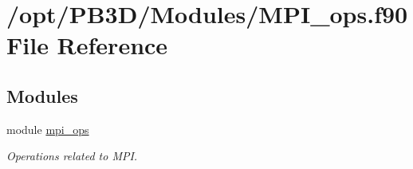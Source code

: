 \hypertarget{MPI__ops_8f90}{}\section{/opt/\+P\+B3\+D/\+Modules/\+M\+P\+I\+\_\+ops.f90 File Reference}
\label{MPI__ops_8f90}
\subsection*{Modules}
\begin{DoxyCompactItemize}
\item 
module \hyperlink{namespacempi__ops}{mpi\+\_\+ops}
\begin{DoxyCompactList}\small\item\em Operations related to M\+PI. \end{DoxyCompactList}\end{DoxyCompactItemize}
